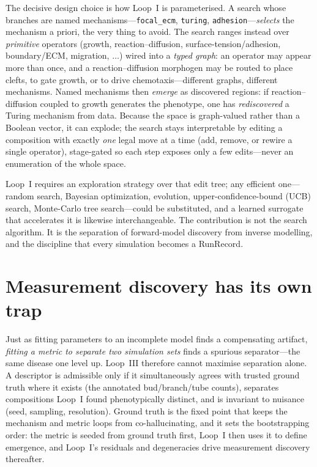 \documentclass[11pt]{article}
\newcommand{\code}[1]{\texttt{#1}}
\begin{document}
The decisive design choice is how Loop~I is parameterised. A search whose branches are named mechanisms---\code{focal\_ecm}, \code{turing}, \code{adhesion}---\emph{selects} the mechanism a priori, the very thing to avoid. The search ranges instead over \emph{primitive} operators (growth, reaction--diffusion, surface-tension/adhesion, boundary/ECM, migration, $\dots$) wired into a \emph{typed graph}: an operator may appear more than once, and a reaction--diffusion morphogen may be routed to place clefts, to gate growth, or to drive chemotaxis---different graphs, different mechanisms. Named mechanisms then \emph{emerge} as discovered regions: if reaction--diffusion coupled to growth generates the phenotype, one has \emph{rediscovered} a Turing mechanism from data. Because the space is graph-valued rather than a Boolean vector, it can explode; the search stays interpretable by editing a composition with exactly \emph{one} legal move at a time (add, remove, or rewire a single operator), stage-gated so each step exposes only a few edits---never an enumeration of the whole space.

Loop~I requires an exploration strategy over that edit tree; any efficient one---random search, Bayesian optimization, evolution, upper-confidence-bound (UCB) search, Monte-Carlo tree search---could be substituted, and a learned surrogate that accelerates it is likewise interchangeable. The contribution is not the search algorithm. It is the separation of forward-model discovery from inverse modelling, and the discipline that every simulation becomes a RunRecord.

\section*{Measurement discovery has its own trap}

Just as fitting parameters to an incomplete model finds a compensating artifact, \emph{fitting a metric to separate two simulation sets} finds a spurious separator---the same disease one level up. Loop~III therefore cannot maximise separation alone. A descriptor is admissible only if it simultaneously agrees with trusted ground truth where it exists (the annotated bud/branch/tube counts), separates compositions Loop~I found phenotypically distinct, and is invariant to nuisance (seed, sampling, resolution). Ground truth is the fixed point that keeps the mechanism and metric loops from co-hallucinating, and it sets the bootstrapping order: the metric is seeded from ground truth first, Loop~I then uses it to define emergence, and Loop~I's residuals and degeneracies drive measurement discovery thereafter.
\end{document}
